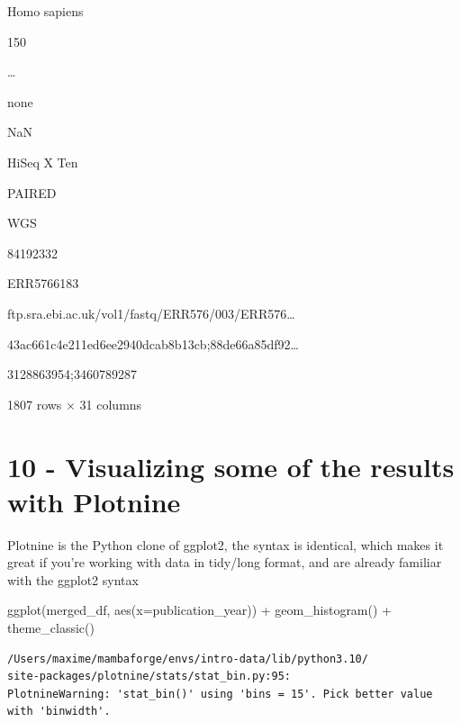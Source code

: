 \documentclass[
  letterpaper,
]{book}
\newenvironment{Shaded}{}{}
\newcommand{\NormalTok}[1]{\textcolor[rgb]{0.14,0.16,0.18}{#1}}
\newcommand{\OperatorTok}[1]{\textcolor[rgb]{0.14,0.16,0.18}{#1}}
\newcommand{\StringTok}[1]{\textcolor[rgb]{0.01,0.18,0.38}{#1}}
\begin{document}
Homo sapiens

150

\ldots{}

none

NaN

HiSeq X Ten

PAIRED

WGS

84192332

ERR5766183

ftp.sra.ebi.ac.uk/vol1/fastq/ERR576/003/ERR576\ldots{}

43ac661c4e211ed6ee2940dcab8b13cb;88de66a85df92\ldots{}

3128863954;3460789287

1807 rows × 31 columns

\hypertarget{visualizing-some-of-the-results-with-plotnine}{%
\section{10 - Visualizing some of the results with
Plotnine}\label{visualizing-some-of-the-results-with-plotnine}}

Plotnine is the Python clone of ggplot2, the syntax is identical, which
makes it great if you're working with data in tidy/long format, and are
already familiar with the ggplot2 syntax

\begin{Shaded}
\begin{Highlighting}[]
\NormalTok{ggplot(merged\_df, aes(x}\OperatorTok{=}\StringTok{\textquotesingle{}publication\_year\textquotesingle{}}\NormalTok{)) }\OperatorTok{+}\NormalTok{ geom\_histogram() }\OperatorTok{+}\NormalTok{ theme\_classic()}
\end{Highlighting}
\end{Shaded}

\begin{verbatim}
/Users/maxime/mambaforge/envs/intro-data/lib/python3.10/
site-packages/plotnine/stats/stat_bin.py:95:
PlotnineWarning: 'stat_bin()' using 'bins = 15'. Pick better value with 'binwidth'.
\end{verbatim}
\end{document}
